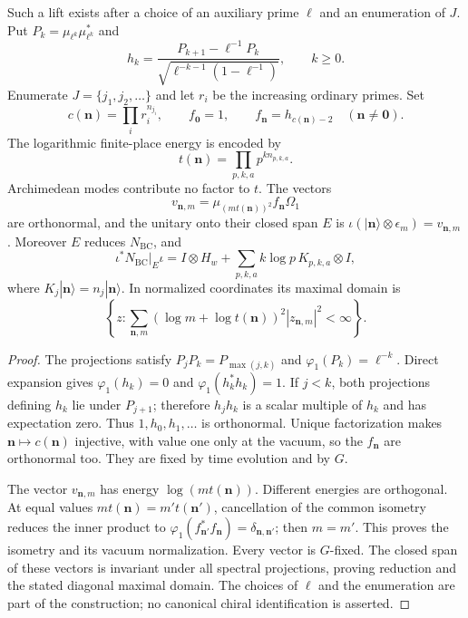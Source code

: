 \begin{lemma}
\label{v4-arith:w5-b:lem:fock-embeds-gns}
Such a lift exists after a choice of an auxiliary prime $\ell$ and
an enumeration of $J$. Put $P_k=\mu_{\ell^k}\mu_{\ell^k}^*$ and
\[
 h_k=\frac{P_{k+1}-\ell^{-1}P_k}
 {\sqrt{\ell^{-k-1}(1-\ell^{-1})}},\qquad k\geq0.
\]
Enumerate $J=\{j_1,j_2,\ldots\}$ and let $r_i$ be the increasing
ordinary primes. Set
\[
 c(\mathbf n)=\prod_i r_i^{n_{j_i}},\qquad
 f_{\mathbf0}=1,\qquad f_{\mathbf n}=h_{c(\mathbf n)-2}
 \quad(\mathbf n\ne\mathbf0).
\]
The logarithmic finite-place energy is encoded by
\[
 t(\mathbf n)=\prod_{p,k,a}p^{k n_{p,k,a}}.
\]
Archimedean modes contribute no factor to $t$. The vectors
\[
 v_{\mathbf n,m}=\mu_{(m t(\mathbf n))^2}f_{\mathbf n}\Omega_1
\]
are orthonormal, and the unitary onto their closed span $E$ is
$\iota(|\mathbf n\rangle\otimes\epsilon_m)=v_{\mathbf n,m}$.
Moreover $E$ reduces $N_{\mathrm{BC}}$, and
\begin{equation}
\label{v4-arith:consumer56:logarithmic-energy}
 \iota^*N_{\mathrm{BC}}|_E\iota
 =I\otimes H_w+\sum_{p,k,a}k\log p\,K_{p,k,a}\otimes I,
\end{equation}
where $K_j|\mathbf n\rangle=n_j|\mathbf n\rangle$.
In normalized coordinates its maximal domain is
\[
 \left\{z:\sum_{\mathbf n,m}
 (\log m+\log t(\mathbf n))^2|z_{\mathbf n,m}|^2<\infty\right\}.
\]
\end{lemma}
\begin{proof}
The projections satisfy $P_jP_k=P_{\max(j,k)}$ and
$\varphi_1(P_k)=\ell^{-k}$. Direct expansion gives
$\varphi_1(h_k)=0$ and $\varphi_1(h_k^*h_k)=1$.
If $j<k$, both projections defining $h_k$ lie under $P_{j+1}$;
therefore $h_jh_k$ is a scalar multiple of $h_k$ and has expectation
zero. Thus $1,h_0,h_1,\ldots$ is orthonormal. Unique factorization
makes $\mathbf n\mapsto c(\mathbf n)$ injective, with value one
only at the vacuum, so the $f_{\mathbf n}$ are orthonormal too.
They are fixed by time evolution and by $G$.

The vector $v_{\mathbf n,m}$ has energy $\log(m t(\mathbf n))$.
Different energies are orthogonal. At equal values
$m t(\mathbf n)=m't(\mathbf n')$, cancellation of the common isometry
reduces the inner product to
$\varphi_1(f_{\mathbf n'}^*f_{\mathbf n})=\delta_{\mathbf n,\mathbf n'}$;
then $m=m'$. This proves the isometry and its vacuum normalization.
Every vector is $G$-fixed. The closed span of these vectors is invariant
under all spectral projections, proving reduction and the stated
diagonal maximal domain. The choices of $\ell$ and the enumeration
are part of the construction; no canonical chiral identification is
asserted.
\end{proof}


